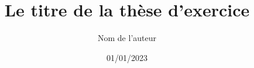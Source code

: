 \documentclass[a4paper, 12pt, oneside]{book}
\title{Le titre de la thèse d'exercice}
\author{Nom de l'auteur}
\date{01/01/2023}
\begin{document}
  \begin{titlingpage}
      
      
  \end{titlingpage}

  
  
  
  
  
  
  
  
  
  
  
\end{document}
